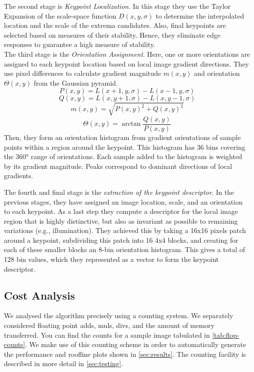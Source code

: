 \documentclass[letterpaper]{article}
\begin{document}
The second stage is \emph{Keypoint Localization}. In this stage they use the Taylor Expansion of the scale-space function $D(x,y,\sigma)$ to determine the interpolated location and the scale of the extrema candidates. Also, final keypoints are selected based on measures of their stability. Hence, they eliminate edge responses to guarantee a high measure of stability.\\

The third stage is the \emph{Orientation Assignment}. Here, one or more orientations are assigned to each keypoint location based on local image gradient directions. They use pixel differences to calculate gradient magnitude $m(x,y)$ and orientation $\Theta(x,y)$ from the Gaussian pyramid.
\begin{equation}
    P(x,y)=L(x+1,y,\sigma) - L(x-1,y,\sigma)
\end{equation}
\begin{equation}
    Q(x,y)=L(x,y+1,\sigma)-L(x,y-1,\sigma)
\end{equation}
\begin{equation}
    m(x,y)=\sqrt{P(x,y)^2+Q(x,y)^2}
\end{equation}
\begin{equation}
    \Theta(x,y)=\arctan{\frac{Q(x,y)}{P(x,y)}}
\end{equation}
Then, they form an orientation histogram from gradient orientations of sample points within a region around the keypoint. This histogram has 36 bins covering the 360° range of orientations. Each sample added to the histogram is weighted by its gradient magnitude. Peaks correspond to dominant directions of local gradients.

The fourth and final stage is the \emph{extraction of the keypoint descriptor}. In the previous stages, they have assigned an image location, scale, and an orientation to each keypoint. As a last step they compute a descriptor for the local image region that is highly distinctive, but also as invariant as possible to remaining variations (e.g., illumination). They achieved this by taking a 16x16 pixels patch around a keypoint, subdividing this patch into 16 4x4 blocks, and creating for each of these smaller blocks an 8-bin orientation histogram. This gives a total of 128 bin values, which they represented as a vector to form the keypoint descriptor.


\subsection*{Cost Analysis}
We analysed the algorithm precisely using a counting system. We separately considered floating point adds, muls, divs, and the amount of memory transferred. You can find the counts for a sample image tabulated in \autoref{tab:flop-counts}. We make use of this counting scheme in order to automatically generate the performance and roofline plots shown in \autoref{sec:results}. The counting facility is described in more detail in \autoref{sec:testing}.
\end{document}
